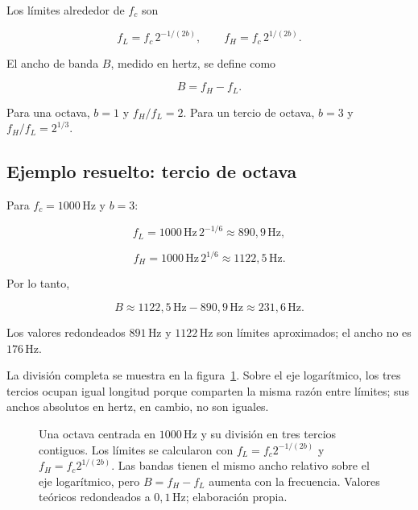 Los límites alrededor de \(f_c\) son

\begin{equation}
    f_L=f_c\,2^{-1/(2b)},
    \qquad
    f_H=f_c\,2^{1/(2b)}.
    \label{eq:u5-limites-banda}
\end{equation}

El ancho de banda \(B\), medido en hertz, se define como

\begin{equation}
    B=f_H-f_L.
    \label{eq:u5-ancho-banda}
\end{equation}

Para una octava, \(b=1\) y \(f_H/f_L=2\). Para un tercio de octava,
\(b=3\) y \(f_H/f_L=2^{1/3}\). 

\subsection{Ejemplo resuelto: tercio de octava}
\label{sec:u5-ejemplo-tercio}

Para \(f_c=1000\,\text{Hz}\) y \(b=3\):

\[
    f_L=1000\,\text{Hz}\,2^{-1/6}
       \approx890{,}9\,\text{Hz},
\]

\[
    f_H=1000\,\text{Hz}\,2^{1/6}
       \approx1122{,}5\,\text{Hz}.
\]

Por lo tanto,

\[
    B\approx1122{,}5\,\text{Hz}-890{,}9\,\text{Hz}
      \approx231{,}6\,\text{Hz}.
\]

Los valores redondeados \(891\,\text{Hz}\) y \(1122\,\text{Hz}\) son límites
aproximados; el ancho no es \(176\,\text{Hz}\).

La división completa se muestra en la
figura~\ref{fig:u5-bandas-octava-tercio}. Sobre el eje logarítmico, los tres
tercios ocupan igual longitud porque comparten la misma razón entre límites;
sus anchos absolutos en hertz, en cambio, no son iguales.

\begin{figure}[htbp]
    \centering
    
    \caption{Una octava centrada en \(1000\,\text{Hz}\) y su división en tres
    tercios contiguos. Los límites se calcularon con
    \(f_L=f_c2^{-1/(2b)}\) y \(f_H=f_c2^{1/(2b)}\). Las bandas tienen el mismo
    ancho relativo sobre el eje logarítmico, pero \(B=f_H-f_L\) aumenta con la
    frecuencia. Valores teóricos redondeados a \(0{,}1\,\text{Hz}\);
    elaboración propia.}
    \label{fig:u5-bandas-octava-tercio}
\end{figure}

